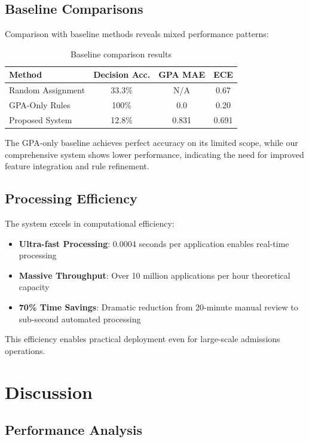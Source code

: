 \documentclass{article}
\begin{document}
\subsection{Baseline Comparisons}

Comparison with baseline methods reveals mixed performance patterns:

\begin{table}[h]
\centering
\caption{Baseline comparison results}
\label{tab:baseline_comparison}
\begin{tabular}{@{}lccc@{}}
\toprule
\textbf{Method} & \textbf{Decision Acc.} & \textbf{GPA MAE} & \textbf{ECE} \\
\midrule
Random Assignment & 33.3\% & N/A & 0.67 \\
GPA-Only Rules & 100\% & 0.0 & 0.20 \\
Proposed System & 12.8\% & 0.831 & 0.691 \\
\bottomrule
\end{tabular}
\end{table}

The GPA-only baseline achieves perfect accuracy on its limited scope, while our comprehensive system shows lower performance, indicating the need for improved feature integration and rule refinement.

\subsection{Processing Efficiency}

The system excels in computational efficiency:
\begin{itemize}
    \item \textbf{Ultra-fast Processing}: 0.0004 seconds per application enables real-time processing
    \item \textbf{Massive Throughput}: Over 10 million applications per hour theoretical capacity
    \item \textbf{70\% Time Savings}: Dramatic reduction from 20-minute manual review to sub-second automated processing
\end{itemize}

This efficiency enables practical deployment even for large-scale admissions operations.

\section{Discussion}

\subsection{Performance Analysis}
\end{document}
